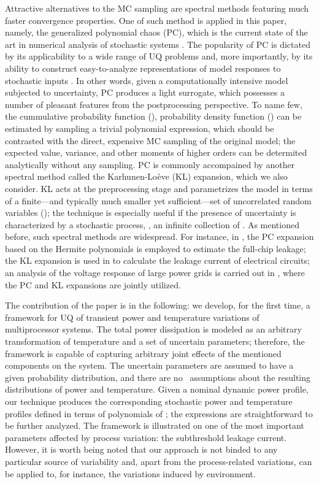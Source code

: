 Attractive alternatives to the MC sampling are spectral methods \cite{xiu2010, maitre2010, ghanem1991} featuring much faster convergence properties. One of such method is applied in this paper, namely, the generalized polynomial chaos (PC), which is the current state of the art in numerical analysis of stochastic systems \cite{xiu2010}. The popularity of PC is dictated by its applicability to a wide range of UQ problems and, more importantly, by its ability to construct easy-to-analyze representations of model responses to stochastic inputs \cite{eldred2009}. In other words, given a computationally intensive model subjected to uncertainty, PC produces a light surrogate, which possesses a number of pleasant features from the postprocessing perspective. To name few, the cummulative probability function (\cdf), probability density function (\pdf) \cite{durrett2010} can be estimated by sampling a trivial polynomial expression, which should be contrasted with the direct, expensive MC sampling of the original model; the expected value, variance, and other moments of higher orders can be determited analytically without any sampling. PC is commonly accompained by another spectral method called the Karhunen-Lo\`{e}ve (KL) expansion, which we also consider. KL acts at the preprocessing stage and parametrizes the model in terms of a finite---and typically much smaller yet sufficient---set of uncorrelated random variables (\rvs); the technique is especially useful if the presence of uncertainty is characterized by a stochastic process, \ie, an infinite collection of \rvs. As mentioned before, such spectral methods are widespread. For instance, in \cite{shen2009}, the PC expansion based on the Hermite polynomials is employed to estimate the full-chip leakage; the KL expansion is used in \cite{bhardwaj2006} to calculate the leakage current of electrical circuits; an analysis of the voltage response of large power grids is carried out in \cite{ghanta2006}, where the PC and KL expansions are jointly utilized.

The contribution of the paper is in the following: we develop, for the first time, a framework for UQ of transient power and temperature variations of multiprocessor systems. The total power dissipation is modeled as an arbitrary transformation of temperature and a set of uncertain parameters; therefore, the framework is capable of capturing arbitrary joint effects of the mentioned components on the system. The uncertain parameters are assumed to have a given probability distribution, and there are no \apriori\ assumptions about the resulting distributions of power and temperature. Given a nominal dynamic power profile, our technique produces the corresponding stochastic power and temperature profiles defined in terms of polynomials of \rvs; the expressions are straightforward to be further analyzed. The framework is illustrated on one of the most important parameters affected by process variation: the subthreshold leakage current. However, it is worth being noted that our approach is not binded to any particular source of variability and, apart from the process-related variations, can be applied to, for instance, the variations induced by environment.

